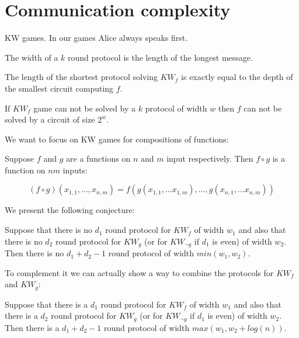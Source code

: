 \section{Communication complexity}

\begin{definition}
   KW games. In our games Alice always speaks first.
\end{definition}


\begin{definition}
    The width of a $k$ round protocol is the length of the longest message.
\end{definition}



\begin{theorem}
The length of the shortest protocol solving $KW_f$ is exactly equal to the depth of the smallest circuit computing $f$.
\end{theorem}

 


\begin{theorem}
If $KW_f$ game can not be solved by a $k$ protocol of width $w$ then $f$ can not be solved by a circuit of size $2^w$.
\end{theorem}

We want to focus on KW games for compositions of functions: 

\begin{definition}
   
   
   Suppose $f$ and $g$ are a functions on $n$ and $m$ input respectively. Then $f \circ g$ is a function on $nm$ inputs:  
   
   \[(f \circ g)(x_{1,1}, \dots , x_{n,m}) = f( g(x_{1,1}, \dots x_{1,m}), \dots,  g(x_{n,1}, \dots x_{n,m}) )\]
   
   
\end{definition}

We present the following conjecture:

\begin{conjecture}
   Suppose that there is no $d_1$ round protocol for $KW_f$ of width $w_1$ and also that there is no $d_2$ round protocol for $KW_g$ (or for $KW_{\neg g}$ if $d_1$ is even) of width $w_2$. Then there is no $d_1+d_2-1$ round protocol of width $min(w_1,w_2)$.
\end{conjecture}

To complement it we can actually show a way to combine the protocols for $KW_f$ and $KW_g$:


\begin{lemma}
   Suppose that there is a $d_1$ round protocol for $KW_f$ of width $w_1$ and also that there is a $d_2$ round protocol for $KW_g$ (or for $KW_{\neg g}$ if $d_1$ is even)  of width $w_2$. Then there is a $d_1+d_2-1$ round protocol of width $max(w_1,w_2+log(n))$.
\end{lemma}

